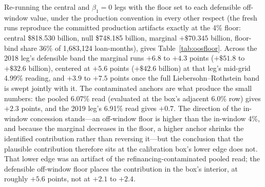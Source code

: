 \documentclass[12pt]{article}
\begin{document}
Re-running the central and $\beta_1 = 0$ legs with the floor set to each defensible off-window value, under the production convention in every other respect (the fresh runs reproduce the committed production artifacts exactly at the 4\% floor: central \$818.530 billion, null \$748.185 billion, marginal $+\$70.345$ billion, floor-bind share 36\% of 1,683,124 loan-months), gives Table~\ref{tab:oosfloor}. Across the 2018 leg's defensible band the marginal runs $+6.8$ to $+4.3$ points ($+\$51.8$ to $+\$32.6$ billion), centered at $+5.6$ points ($+\$42.6$ billion) at that leg's mid-grid 4.99\% reading, and $+3.9$ to $+7.5$ points once the full Liebersohn--Rothstein band is swept jointly with it. The contaminated anchors are what produce the small numbers: the pooled 6.07\% read (evaluated at the box's adjacent 6.0\% row) gives $+2.3$ points, and the 2019 leg's 6.91\% read gives $+0.7$. The direction of the in-window concession stands---an off-window floor is higher than the in-window 4\%, and because the marginal decreases in the floor, a higher anchor shrinks the identified contribution rather than reversing it---but the conclusion that the plausible contribution therefore sits at the calibration box's lower edge does not. That lower edge was an artifact of the refinancing-contaminated pooled read; the defensible off-window floor places the contribution in the box's interior, at roughly $+5.6$ points, not at $+2.1$ to $+2.4$.
\end{document}
